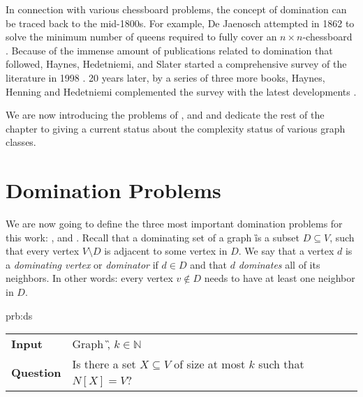 In connection with various chessboard problems, the concept of domination can be traced back to the mid-1800s.
For example, De Jaenosch attempted in 1862 to solve the minimum number of queens required to fully cover an $n \times n$-chessboard \cite{Jaenisch1862}.
Because of the immense amount of publications related to domination that followed, Haynes, Hedetniemi, and Slater started a comprehensive survey of the literature in 1998 \cite{Haynes1998, Haynes1998b}. 
20 years later, by a series of three more books, Haynes, Henning and Hedetniemi complemented the survey with the latest developments \cite{Haynes2020, Haynes2021, Haynes2022}.

We are now introducing the problems of \dom, \sdom and \tdom and dedicate the rest of the chapter to giving a current status about the complexity status of various graph classes. 




\section{Domination Problems}

We are now going to define the three most important domination problems for this work: \dom, \sdom and \tdom.
Recall that a dominating set of a graph \G is a subset $D \subseteq V$, such that every vertex $V \setminus D$ is adjacent to some vertex in $D$.
We say that a vertex $d$ is a \textit{dominating vertex} or \textit{dominator} if $d \in D$ and that $d$ \textit{dominates} all of its neighbors.
In other words: every vertex $v \notin D$ needs to have at least one neighbor in $D$.

\begin{prb}{prb:ds}
    \begin{tabularx}{1.0\textwidth}{>{\hsize=0.30\hsize}X>{\hsize=0.8\hsize}X}
        \textbf{Input} & Graph \G, $k \in \mathbb{N}$\\
        \textbf{Question} & Is there a set {$X \subseteq V$} of size at most $k$ such that ${N[X] = V}$? \\
    \end{tabularx}
\end{prb}

